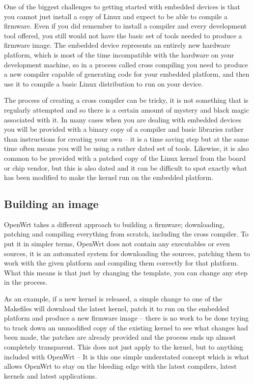 One of the biggest challenges to getting started with embedded devices is that you
cannot just install a copy of Linux and expect to be able to compile a firmware.
Even if you did remember to install a compiler and every development tool offered,
you still would not have the basic set of tools needed to produce a firmware image.
The embedded device represents an entirely new hardware platform, which is
most of the time incompatible with the hardware on your development machine, so in a process called
cross compiling you need to produce a new compiler capable of generating code for
your embedded platform, and then use it to compile a basic Linux distribution to
run on your device.

The process of creating a cross compiler can be tricky, it is not something that is
regularly attempted and so there is a certain amount of mystery and black magic
associated with it. In many cases when you are dealing with embedded devices you will
be provided with a binary copy of a compiler and basic libraries rather than
instructions for creating your own -- it is a time saving step but at the same time
often means you will be using a rather dated set of tools. Likewise, it is also common
to be provided with a patched copy of the Linux kernel from the board or chip vendor,
but this is also dated and it can be difficult to spot exactly what has been
modified to make the kernel run on the embedded platform.

\subsection{Building an image}

OpenWrt takes a different approach to building a firmware; downloading, patching
and compiling everything from scratch, including the cross compiler. To put it
in simpler terms, OpenWrt does not contain any executables or even sources, it is an
automated system for downloading the sources, patching them to work with the given
platform and compiling them correctly for that platform. What this means is that
just by changing the template, you can change any step in the process.

As an example, if a new kernel is released, a simple change to one of the Makefiles
will download the latest kernel, patch it to run on the embedded platform and produce
a new firmware image -- there is no work to be done trying to track down an unmodified
copy of the existing kernel to see what changes had been made, the patches are
already provided and the process ends up almost completely transparent. This does not
just apply to the kernel, but to anything included with OpenWrt -- It is this one
simple understated concept which is what allows OpenWrt to stay on the bleeding edge
with the latest compilers, latest kernels and latest applications.


